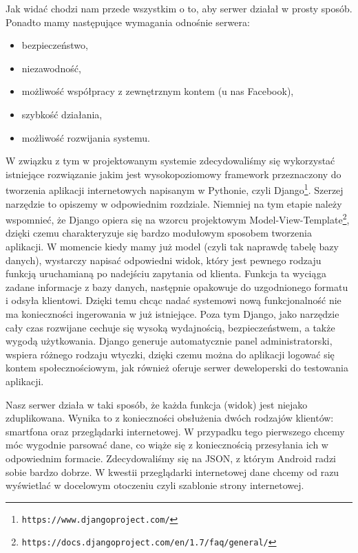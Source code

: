 \documentclass[12pt,titlepage]{article}
\begin{document}
Jak widać chodzi nam przede wszystkim o to, aby serwer działał w prosty sposób. Ponadto mamy następujące wymagania odnośnie serwera:

\begin{itemize}
 \item bezpieczeństwo,
 \item niezawodność,
 \item możliwość współpracy z zewnętrznym kontem (u nas Facebook),
 \item szybkość działania,
 \item możliwość rozwijania systemu.
\end{itemize}

W związku z tym w projektowanym systemie zdecydowaliśmy się wykorzystać istniejące rozwiązanie jakim jest wysokopoziomowy framework przeznaczony do tworzenia aplikacji internetowych napisanym w Pythonie,
czyli Django\footnote{\verb|https://www.djangoproject.com/|}. Szerzej narzędzie to opiszemy w odpowiednim rozdziale. Niemniej na tym etapie należy wspomnieć, że Django opiera się na 
wzorcu projektowym Model-View-Template\footnote{\verb|https://docs.djangoproject.com/en/1.7/faq/general/|}, dzięki czemu charakteryzuje się bardzo modułowym sposobem tworzenia aplikacji.
W momencie kiedy mamy już model (czyli tak naprawdę tabelę bazy danych), wystarczy napisać odpowiedni widok, który jest pewnego rodzaju funkcją uruchamianą po nadejściu zapytania od klienta.
Funkcja ta wyciąga zadane informacje z bazy danych, następnie opakowuje do uzgodnionego formatu i odsyła klientowi. Dzięki temu chcąc nadać systemowi nową funkcjonalność nie ma konieczności
ingerowania w już istniejące. Poza tym Django, jako narzędzie cały czas rozwijane cechuje się wysoką wydajnością, bezpieczeństwem, a także wygodą użytkowania. Django generuje automatycznie panel
administratorski, wspiera różnego rodzaju wtyczki, dzięki czemu można do aplikacji logować się kontem społecznościowym, jak również oferuje serwer deweloperski do testowania aplikacji.

Nasz serwer działa w taki sposób, że każda funkcja (widok) jest niejako zduplikowana. Wynika to z konieczności obsłużenia dwóch rodzajów klientów: smartfona oraz przeglądarki internetowej.
W przypadku tego pierwszego chcemy móc wygodnie parsować dane, co wiąże się z koniecznością przesyłania ich w odpowiednim formacie. Zdecydowaliśmy się na JSON, z którym Android radzi sobie bardzo dobrze.
W kwestii przeglądarki internetowej dane chcemy od razu wyświetlać w docelowym otoczeniu czyli szablonie strony internetowej.
\end{document}
